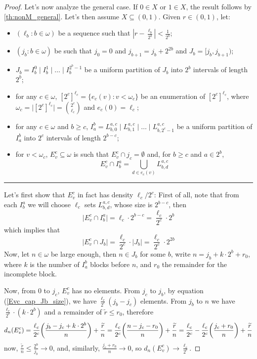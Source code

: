 \begin{proof}
        Let's now analyze the general case. If $0\in X$ or $1\in X$, the result follows by \cref{th:nonM_general}. Let's then assume $X\subseteq(0,1)$. Given $r\in(0,1)$, let:
    \begin{itemize}
        \item $(\ell_b:b\in\omega)$ be a sequence such that $\left\lvert r-\frac{\ell_b}{2^b}\right\rvert<\frac1{2^b}$;
        \item $(j_b:b\in\omega)$ be such that $j_0=0$ and $j_{b+1}=j_b+2^{2b}$ and $J_b=[j_b,j_{b+1})$;
        \item $J_b=I_b^0\;\vert\; I_b^1\;\vert\;\dots\;\vert\;I_b^{2^b-1}$ be a uniform partition of $J_b$ into $2^b$ intervals of length $2^b$;
        \item for any $c\in\omega$, $[2^c]^{\ell_c}=\{e_c(v):v<\omega_c\}$ be an enumeration of $[2^c]^{\ell_c}$, where $\omega_c=\lvert[2^c]^{\ell_c}\rvert=\binom{2^c}{\ell_c}$ and $e_c(0)=\ell_c$;
        \item for any $c\in\omega$ and $b\geq c$, $I_a^b=L_{b,0}^{a,c}\;\vert\;L_{b,1}^{a,c}\;\vert\;\dots\;\vert\;L_{b,2^c-1}^{a,c}$ be a uniform partition of $I_a^b$ into $2^c$ intervals of length $2^{b-c}$;
        \item for $v<\omega_c$, $E_v^c\subseteq\omega$ is such that $E_v^c\cap j_c=\emptyset$ and, for $b\geq c$ and $a\in 2^b$,
        $$E_v^c\cap I_b^a=\bigcup_{d\in e_c(v)}L_{b,d}^{a,c}$$
    \end{itemize}
    \noindent\rule{16.6cm}{0.4pt}

    Let's first show that $E_v^c$ in fact has density $\ell_c/2^c$: First of all, note that from each $I^a_b$ we will choose $\ell_c$ sets $L_{b,d}^{a,c}$, whose size is $2^{b-c}$, then
    $$\lvert E_v^c\cap I^a_b\rvert=\ell_c\cdot 2^{b-c}=\frac{\ell_c}{2^c}\cdot 2^b$$
    which implies that
    \begin{equation}\label{Evc_cap_Jb_size}
        \lvert E_v^c\cap J_b\rvert=\frac{\ell_c}{2^c}\cdot\lvert J_b\rvert=\frac{\ell_c}{2^c}\cdot 2^{2b}
    \end{equation}
    Now, let $n\in\omega$ be large enough, then $n\in J_b$ for some $b$, write $n=j_b+k\cdot2^b+r_0$, where $k$ is the number of $I_a^b$ blocks before $n$, and $r_0$ the remainder for the incomplete block.

    Now, from $0$ to $j_c$, $E_v^c$ has no elements. From $j_c$ to $j_b$, by equation (\ref{Evc_cap_Jb_size}), we have $\frac{\ell_c}{2^c}(j_b-j_c)$ elements. From $j_b$ to $n$ we have $\frac{\ell_c}{2^c}\cdot(k\cdot 2^b)$ and a remainder of $\widetilde{r}\leq r_0$, therefore
    $$d_n(E_v^c)=\frac{\ell_c}{2^c}{\left(\frac{j_b-j_c+k\cdot 2^b}n\right)}+\frac{\widetilde{r}}{n}=\frac{\ell_c}{2^c}{\left(\frac{n-j_c-r_0}n\right)}+\frac{\widetilde{r}}{n}=\frac{\ell_c}{2^c}-\frac{\ell_c}{2^c}{\left(\frac{j_c+r_0}n\right)}+\frac{\widetilde{r}}{n}$$
    now, $\frac{\widetilde{r}}n\leq\frac{2^b}{j_b}\to0$, and, similarly, $\frac{j_c+r_0}n\to0$, so $d_n(E_v^c)\to\frac{\ell_c}{2^c}$.


\end{proof}
